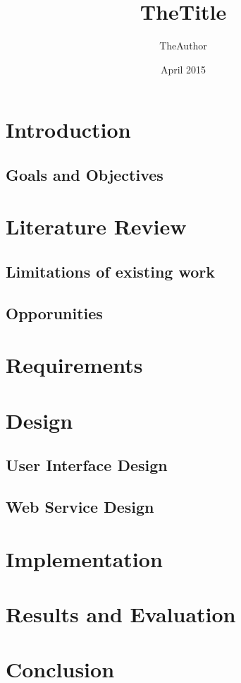 \documentclass[11pt,twoside,a4paper]{article}
\begin{document}
\title{TheTitle}
\author{TheAuthor}
\date{April 2015}
\maketitle
\tableofcontents

\begin{abstract}

\end{abstract}

\section{Introduction}

\subsection{Goals and Objectives}

\section{Literature Review}

\subsection{Limitations of existing work}

\subsection{Opporunities}

\section{Requirements}

\section{Design}

\subsection{User Interface Design}

\subsection{Web Service Design}

\section{Implementation}

\section{Results and Evaluation}

\section{Conclusion}
\end{document}
